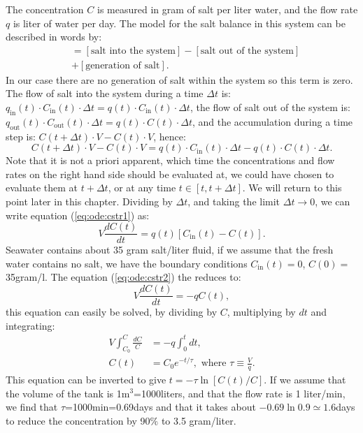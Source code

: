\documentclass[graybox,sectrefs,envcountresetchap,open=right,final]{svmonodo}
\begin{document}
The concentration $C$ is measured in gram of salt per liter water, and the flow rate $q$ is liter of water per day. The model for the salt balance in this system can be described in words by:
\begin{align}
[\text{accumulation of salt}] &= [\text{salt into the system}] - [\text{salt out of the system}]\nonumber\\ 
& + [\text{generation of salt}].\label{eq:ode:mbal}
\end{align}
In our case there are no generation of salt within the system so this term is zero. The flow of salt into the system during a time $\Delta t$ is: 
$q_\text{in}(t)\cdot C_\text{in}(t)\cdot \Delta t=q(t)\cdot C_\text{in}(t)\cdot \Delta t$, 
the flow of salt out of the system is: $q_\text{out}(t)\cdot C_\text{out}(t)\cdot \Delta t=q(t)\cdot C(t)\cdot \Delta t$, and the accumulation during a time step is:
$C(t+\Delta t)\cdot V - C(t)\cdot V$, hence:
\begin{equation}
C(t+\Delta t)\cdot V - C(t)\cdot V = q(t)\cdot C_\text{in}(t)\cdot \Delta t - q(t)\cdot C(t)\cdot \Delta t.\label{eq:ode:cstr1}
\end{equation}
Note that it is not a priori apparent, which time the concentrations and flow rates on the right hand side should be evaluated at, 
we could have chosen to evaluate them at $t+\Delta t$, or at any time $t\in [t,t+\Delta t]$. We will return to this point later in this chapter. Dividing by $\Delta t$, and taking the limit
$\Delta t\to 0$, we can write equation (\ref{eq:ode:cstr1}) as:
\begin{equation}
V\frac{dC(t)}{dt} = q(t)\left[C_\text{in}(t) - C(t)\right].\label{eq:ode:cstr2}
\end{equation}
Seawater contains about 35 gram salt/liter fluid, if we assume that the fresh water contains no salt, we have the boundary conditions
$C_\text{in}(t)=0$, $C(0)=$35gram/l. The equation (\ref{eq:ode:cstr2}) the reduces to:
\begin{equation}
V\frac{dC(t)}{dt} = -qC(t),\label{eq:ode:cstr3}
\end{equation}
this equation can easily be solved, by dividing by $C$, multiplying by $dt$ and integrating:
\begin{align}
V\int_{C_0}^C\frac{dC}{C} &= -q\int_0^tdt,\nonumber\\ 
C(t)&=C_0e^{-t/\tau},\text{ where } \tau\equiv \frac{V}{q}.\label{eq:ode:sol}
\end{align}
This equation can be inverted to give $t=-\tau\ln[C(t)/C]$. If we assume that the volume of the tank is 1m$^3$=1000liters, 
and that the flow rate is 1 liter/min, we find that $\tau$=1000min=0.69days and that it takes about $-0.69\ln0.9\simeq1.6$days to reduce the concentration
by 90$\%$ to 3.5 gram/liter.     
\end{document}
